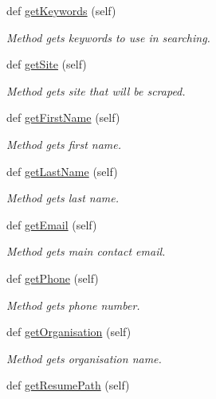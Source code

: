 \begin{DoxyCompactItemize}
def \hyperlink{classuserProfile_1_1userProfile_a1a61a204207c67cc6bc2c0b2b810ea32}{get\+Keywords} (self)
\begin{DoxyCompactList}\small\item\em Method gets keywords to use in searching. \end{DoxyCompactList}\item 
def \hyperlink{classuserProfile_1_1userProfile_afa86adbeac8ea685d8c9f1d343f734fd}{get\+Site} (self)
\begin{DoxyCompactList}\small\item\em Method gets site that will be scraped. \end{DoxyCompactList}\item 
def \hyperlink{classuserProfile_1_1userProfile_a3b66b43cf824415acf3c18dfb71ae226}{get\+First\+Name} (self)
\begin{DoxyCompactList}\small\item\em Method gets first name. \end{DoxyCompactList}\item 
def \hyperlink{classuserProfile_1_1userProfile_acb6d2593a392756816a448e09bdc1b24}{get\+Last\+Name} (self)
\begin{DoxyCompactList}\small\item\em Method gets last name. \end{DoxyCompactList}\item 
def \hyperlink{classuserProfile_1_1userProfile_a31aed4505464a0f546e0bb33306a355d}{get\+Email} (self)
\begin{DoxyCompactList}\small\item\em Method gets main contact email. \end{DoxyCompactList}\item 
def \hyperlink{classuserProfile_1_1userProfile_ac6014db8a44e3e1ea44d30a2dbeb2b25}{get\+Phone} (self)
\begin{DoxyCompactList}\small\item\em Method gets phone number. \end{DoxyCompactList}\item 
def \hyperlink{classuserProfile_1_1userProfile_aa146aa6eba2de13cfcff77e14409b891}{get\+Organisation} (self)
\begin{DoxyCompactList}\small\item\em Method gets organisation name. \end{DoxyCompactList}\item 
def \hyperlink{classuserProfile_1_1userProfile_aa89ac2871990f63c02a2bebb3393c979}{get\+Resume\+Path} (self)

\end{DoxyCompactItemize}
